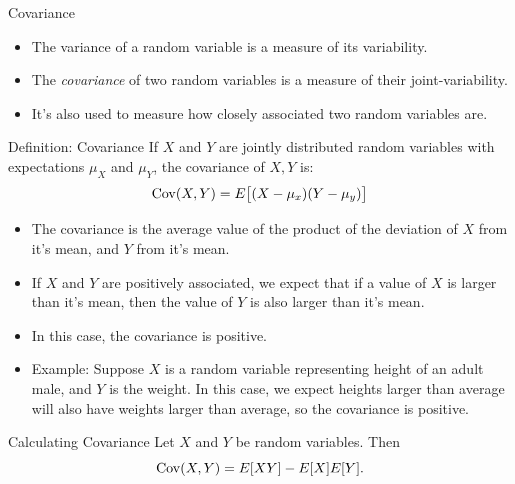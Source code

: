 \begin{frame}[allowframebreaks]{Covariance}
  \begin{itemize}
    \item The variance of a random variable is a measure of its variability.
    \item The \emph{covariance} of two random variables is a measure of their joint-variability. 
    \item It's also used to measure how closely associated two random variables are.
  \end{itemize}
  
  \begin{block}{Definition: Covariance}
    If $X$ and $Y$ are jointly distributed random variables with expectations $\mu_X$ and $\mu_Y$, the covariance of $X, Y$ is:
    $$
    \mathrm{Cov}(X, Y) = E\big[(X - \mu_x)(Y - \mu_y)\big]
    $$
  \end{block}
  
  \framebreak
  
  \begin{itemize}
    \item The covariance is the average value of the product of the deviation of $X$ from it's mean, and $Y$ from it's mean.
    \item If $X$ and $Y$ are positively associated, we expect that if a value of $X$ is larger than it's mean, then the value of $Y$ is also larger than it's mean.
    \item In this case, the covariance is positive.
    \item Example: Suppose $X$ is a random variable representing height of an adult male, and $Y$ is the weight. In this case, we expect heights larger than average will also have weights larger than average, so the covariance is positive.
  \end{itemize}
  
  \framebreak
  
  \begin{block}{Calculating Covariance}
    Let $X$ and $Y$ be random variables. Then
    $$
    \mathrm{Cov}(X, Y) = E[XY] - E[X]E[Y].
    $$
    
    

\end{block}
\end{frame}
